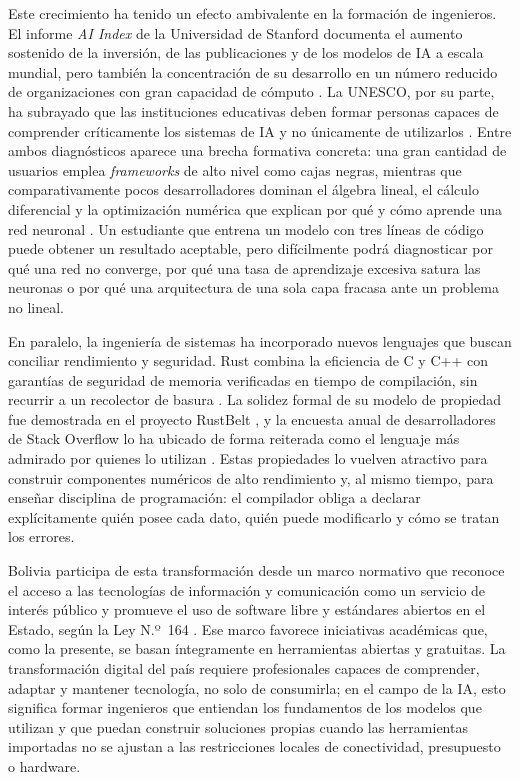 Este crecimiento ha tenido un efecto ambivalente en la formación de ingenieros. El informe \emph{AI Index} de la Universidad de Stanford documenta el aumento sostenido de la inversión, de las publicaciones y de los modelos de IA a escala mundial, pero también la concentración de su desarrollo en un número reducido de organizaciones con gran capacidad de cómputo \citep{maslej2024}. La UNESCO, por su parte, ha subrayado que las instituciones educativas deben formar personas capaces de comprender críticamente los sistemas de IA y no únicamente de utilizarlos \citep{unesco2022}. Entre ambos diagnósticos aparece una brecha formativa concreta: una gran cantidad de usuarios emplea \emph{frameworks} de alto nivel como cajas negras, mientras que comparativamente pocos desarrolladores dominan el álgebra lineal, el cálculo diferencial y la optimización numérica que explican por qué y cómo aprende una red neuronal \citep{deisenroth2020}. Un estudiante que entrena un modelo con tres líneas de código puede obtener un resultado aceptable, pero difícilmente podrá diagnosticar por qué una red no converge, por qué una tasa de aprendizaje excesiva satura las neuronas o por qué una arquitectura de una sola capa fracasa ante un problema no lineal.

En paralelo, la ingeniería de sistemas ha incorporado nuevos lenguajes que buscan conciliar rendimiento y seguridad. Rust combina la eficiencia de C y C++ con garantías de seguridad de memoria verificadas en tiempo de compilación, sin recurrir a un recolector de basura \citep{matsakis2014,klabnik2023}. La solidez formal de su modelo de propiedad fue demostrada en el proyecto RustBelt \citep{jung2018}, y la encuesta anual de desarrolladores de Stack Overflow lo ha ubicado de forma reiterada como el lenguaje más admirado por quienes lo utilizan \citep{stackoverflow2024}. Estas propiedades lo vuelven atractivo para construir componentes numéricos de alto rendimiento y, al mismo tiempo, para enseñar disciplina de programación: el compilador obliga a declarar explícitamente quién posee cada dato, quién puede modificarlo y cómo se tratan los errores.

Bolivia participa de esta transformación desde un marco normativo que reconoce el acceso a las tecnologías de información y comunicación como un servicio de interés público y promueve el uso de software libre y estándares abiertos en el Estado, según la Ley N.º~164 \citep{bolivia2011}. Ese marco favorece iniciativas académicas que, como la presente, se basan íntegramente en herramientas abiertas y gratuitas. La transformación digital del país requiere profesionales capaces de comprender, adaptar y mantener tecnología, no solo de consumirla; en el campo de la IA, esto significa formar ingenieros que entiendan los fundamentos de los modelos que utilizan y que puedan construir soluciones propias cuando las herramientas importadas no se ajustan a las restricciones locales de conectividad, presupuesto o hardware.

